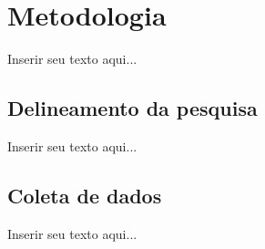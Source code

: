 %
%

\chapter{Metodologia}

Inserir seu texto aqui...

\section{Delineamento da pesquisa}

Inserir seu texto aqui...

\section{Coleta de dados}

Inserir seu texto aqui...
